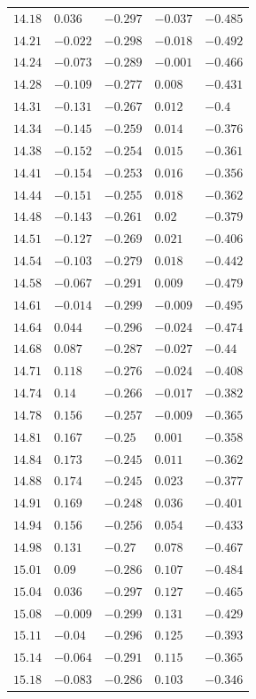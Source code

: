 \begin{center}
\begin{longtable}{lllll}
$14.18$&$0.036$&$-0.297$&$-0.037$&$-0.485$\\
$14.21$&$-0.022$&$-0.298$&$-0.018$&$-0.492$\\
$14.24$&$-0.073$&$-0.289$&$-0.001$&$-0.466$\\
$14.28$&$-0.109$&$-0.277$&$0.008$&$-0.431$\\
$14.31$&$-0.131$&$-0.267$&$0.012$&$-0.4$\\
$14.34$&$-0.145$&$-0.259$&$0.014$&$-0.376$\\
$14.38$&$-0.152$&$-0.254$&$0.015$&$-0.361$\\
$14.41$&$-0.154$&$-0.253$&$0.016$&$-0.356$\\
$14.44$&$-0.151$&$-0.255$&$0.018$&$-0.362$\\
$14.48$&$-0.143$&$-0.261$&$0.02$&$-0.379$\\
$14.51$&$-0.127$&$-0.269$&$0.021$&$-0.406$\\
$14.54$&$-0.103$&$-0.279$&$0.018$&$-0.442$\\
$14.58$&$-0.067$&$-0.291$&$0.009$&$-0.479$\\
$14.61$&$-0.014$&$-0.299$&$-0.009$&$-0.495$\\
$14.64$&$0.044$&$-0.296$&$-0.024$&$-0.474$\\
$14.68$&$0.087$&$-0.287$&$-0.027$&$-0.44$\\
$14.71$&$0.118$&$-0.276$&$-0.024$&$-0.408$\\
$14.74$&$0.14$&$-0.266$&$-0.017$&$-0.382$\\
$14.78$&$0.156$&$-0.257$&$-0.009$&$-0.365$\\
$14.81$&$0.167$&$-0.25$&$0.001$&$-0.358$\\
$14.84$&$0.173$&$-0.245$&$0.011$&$-0.362$\\
$14.88$&$0.174$&$-0.245$&$0.023$&$-0.377$\\
$14.91$&$0.169$&$-0.248$&$0.036$&$-0.401$\\
$14.94$&$0.156$&$-0.256$&$0.054$&$-0.433$\\
$14.98$&$0.131$&$-0.27$&$0.078$&$-0.467$\\
$15.01$&$0.09$&$-0.286$&$0.107$&$-0.484$\\
$15.04$&$0.036$&$-0.297$&$0.127$&$-0.465$\\
$15.08$&$-0.009$&$-0.299$&$0.131$&$-0.429$\\
$15.11$&$-0.04$&$-0.296$&$0.125$&$-0.393$\\
$15.14$&$-0.064$&$-0.291$&$0.115$&$-0.365$\\
$15.18$&$-0.083$&$-0.286$&$0.103$&$-0.346$\\

\end{longtable}
\end{center}
